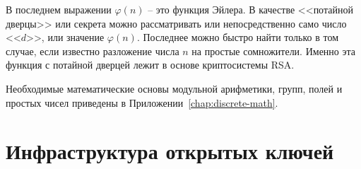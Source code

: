 В последнем выражении $\varphi \left( n \right)$ -- это функция Эйлера. В качестве <<потайной дверцы>> или секрета можно рассматривать или непосредственно само число <<$d$>>, или значение $\varphi \left( n \right)$. Последнее можно быстро найти только в том случае, если известно разложение числа $n$ на простые сомножители. Именно эта функция с потайной дверцей лежит в основе криптосистемы RSA.

Необходимые математические основы модульной арифметики, групп, полей и простых чисел приведены в Приложении~\ref{chap:discrete-math}.









\section{Инфраструктура открытых ключей}\label{chapter-public-key-infrastructure}




